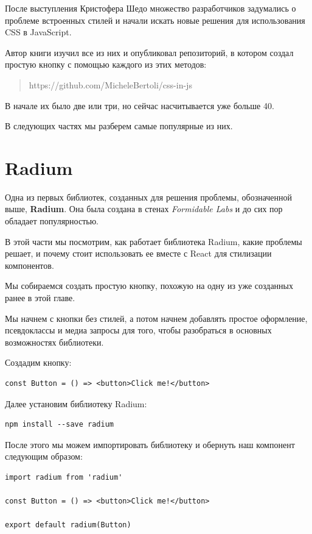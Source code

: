 После выступления Кристофера Шедо множество разработчиков задумались о проблеме встроенных стилей и начали искать новые решения для использования CSS в JavaScript.

Автор книги изучил все из них и опубликовал репозиторий, в котором создал простую кнопку с помощью каждого из этих методов:

\begin{quotation}
https://github.com/MicheleBertoli/css-in-js
\end{quotation}

В начале их было две или три, но сейчас насчитывается уже больше 40.

В следующих частях мы разберем самые популярные из них.

\section{Radium}

Одна из первых библиотек, созданных для решения проблемы, обозначенной выше, \textbf{Radium}. Она была создана в стенах \textit{Formidable Labs} и до сих пор обладает популярностью.

В этой части мы посмотрим, как работает библиотека Radium, какие проблемы решает, и почему стоит использовать ее вместе с React для стилизации компонентов.

Мы собираемся создать простую кнопку, похожую на одну из уже созданных ранее в этой главе.

Мы начнем с кнопки без стилей, а потом начнем добавлять простое оформление, псевдоклассы и медиа запросы для того, чтобы разобраться в основных возможностях библиотеки.

Создадим кнопку:

\begin{lstlisting}
const Button = () => <button>Click me!</button>	
\end{lstlisting}

Далее установим библиотеку Radium:

\begin{lstlisting}
npm install --save radium
\end{lstlisting}

После этого мы можем импортировать библиотеку и обернуть наш компонент следующим образом:

\begin{lstlisting}
import radium from 'radium'

const Button = () => <button>Click me!</button>

export default radium(Button)
\end{lstlisting}

